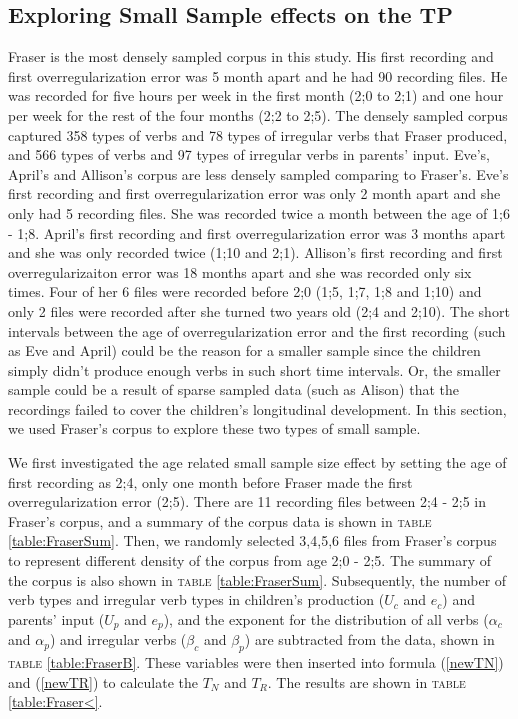 \subsection{Exploring Small Sample effects on the TP}
Fraser is the most densely sampled corpus in this study. His first recording and first overregularization error was 5 month apart and he had 90 recording files. He was recorded for five hours per week in the first month (2;0 to 2;1) and one hour per week for the rest of the four months (2;2 to 2;5). The densely sampled corpus captured 358 types of verbs and 78 types of irregular verbs that Fraser produced, and 566 types of verbs and 97 types of irregular verbs in parents' input. Eve's, April's and Allison's corpus are less densely sampled comparing to Fraser's. Eve's first recording and first overregularization error was only 2 month apart and she only had 5 recording files. She was recorded twice a month between the age of 1;6 - 1;8. April's first recording and first overregularization error was 3 months apart and she was only recorded twice (1;10 and 2;1). Allison's first recording and first overregularizaiton error was 18 months apart and she was recorded only six times. Four of her 6 files were recorded before 2;0 (1;5, 1;7, 1;8 and 1;10) and only 2 files were recorded after she turned two years old (2;4 and 2;10). The short intervals between the age of overregularization error and the first recording (such as Eve and April) could be the reason for a smaller sample since the children simply didn't produce enough verbs in such short time intervals. Or, the smaller sample could be a result of sparse sampled data (such as Alison) that the recordings failed to cover the children's longitudinal development. In this section, we used Fraser's corpus to explore these two types of small sample. 

We first investigated the age related small sample size effect by setting the age of first recording as 2;4, only one month before Fraser made the first overregularization error (2;5). There are 11 recording files between 2;4 - 2;5 in Fraser's corpus, and a summary of the corpus data is shown in \textsc{table} \ref{table:FraserSum}. Then, we randomly selected 3,4,5,6 files from Fraser's corpus to represent different density of the corpus from age 2;0 - 2;5. The summary of the corpus is also shown in \textsc{table} \ref{table:FraserSum}. Subsequently, the number of verb types and irregular verb types in children's production ($U_c$ and $e_c$) and parents' input ($U_p$ and $e_p$), and the exponent for the distribution of all verbs ($\alpha_c$ and $\alpha_p$) and irregular verbs  ($\beta_c$ and $\beta_p$) are subtracted from the data, shown in \textsc{table} \ref{table:FraserB}. These variables were then inserted into formula (\ref{newTN}) and (\ref{newTR}) to calculate the $T_N$ and $T_R$. The results are shown in \textsc{table} \ref{table:Fraser<}.


